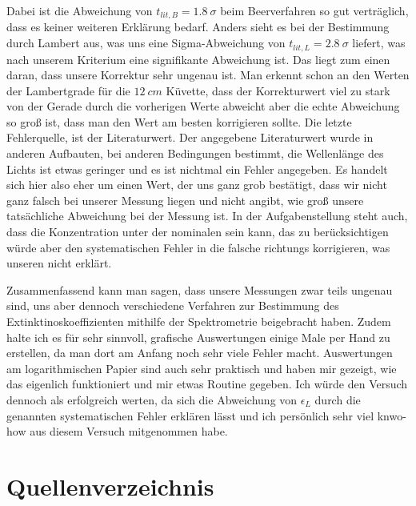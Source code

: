 \documentclass{article}
\begin{document}
Dabei ist die Abweichung von $t_{lit, B} = \qty{1.8}{\sigma}$ beim Beerverfahren so gut verträglich, 
dass es keiner weiteren Erklärung bedarf. Anders sieht es bei der Bestimmung durch Lambert aus, was uns 
eine Sigma-Abweichung von $t_{lit,L}  =  \qty{2.8}{\sigma}$ liefert, was nach unserem Kriterium eine signifikante Abweichung ist.
Das liegt zum einen daran, dass unsere Korrektur sehr ungenau ist. Man erkennt schon an den Werten der Lambertgrade für 
die $\qty{12}{cm}$ Küvette, dass der Korrekturwert viel zu stark von der Gerade durch die vorherigen Werte 
abweicht aber die echte Abweichung so groß ist, dass man den Wert am besten korrigieren sollte.
Die letzte Fehlerquelle, ist der Literaturwert. Der angegebene Literaturwert wurde in anderen Aufbauten,
bei anderen Bedingungen bestimmt, die Wellenlänge des Lichts ist etwas geringer und es ist nichtmal ein 
Fehler angegeben.
Es handelt sich hier also eher um einen Wert, der uns ganz grob bestätigt, dass wir nicht ganz falsch bei unserer
Messung liegen und nicht angibt, wie groß unsere tatsächliche Abweichung bei der Messung ist.
In der Aufgabenstellung steht auch, dass die Konzentration unter der nominalen sein kann,
das zu berücksichtigen würde aber den systematischen Fehler in die falsche richtungs korrigieren, was unseren 
nicht erklärt.

Zusammenfassend kann man sagen, dass unsere Messungen zwar teils ungenau sind, uns aber dennoch verschiedene
Verfahren zur Bestimmung des Extinktinoskoeffizienten mithilfe der Spektrometrie beigebracht haben. Zudem
halte ich es für sehr sinnvoll, grafische Auswertungen einige Male per Hand zu erstellen, da man dort am Anfang
noch sehr viele Fehler macht. Auswertungen am logarithmischen Papier sind auch sehr praktisch und haben mir gezeigt,
wie das eigenlich funktioniert und mir etwas Routine gegeben.
Ich würde den Versuch dennoch als erfolgreich werten, da sich die Abweichung von $\epsilon_L$ durch die
genannten systematischen Fehler erklären lässt und ich persönlich sehr viel knwo-how aus diesem Versuch mitgenommen habe.

\section{Quellenverzeichnis}
\label{sec:quellen}
\end{document}
